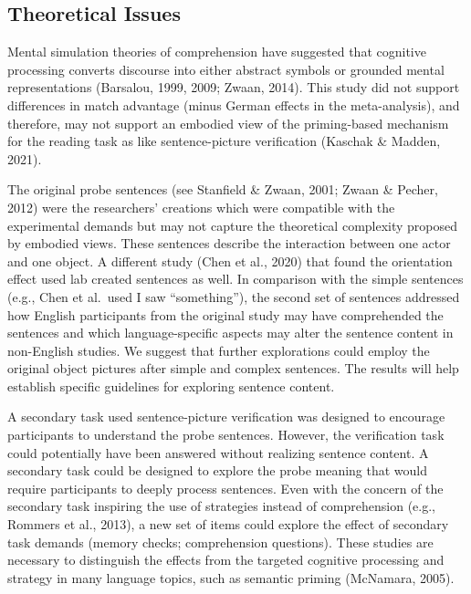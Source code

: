 \documentclass[
  man]{apa7}
\begin{document}
\hypertarget{theoretical-issues}{%
\subsection{Theoretical Issues}\label{theoretical-issues}}

Mental simulation theories of comprehension have suggested that cognitive processing converts discourse into either abstract symbols or grounded mental representations (Barsalou, 1999, 2009; Zwaan, 2014). This study did not support differences in match advantage (minus German effects in the meta-analysis), and therefore, may not support an embodied view of the priming-based mechanism for the reading task as like sentence-picture verification (Kaschak \& Madden, 2021).

The original probe sentences (see Stanfield \& Zwaan, 2001; Zwaan \& Pecher, 2012) were the researchers' creations which were compatible with the experimental demands but may not capture the theoretical complexity proposed by embodied views. These sentences describe the interaction between one actor and one object. A different study (Chen et al., 2020) that found the orientation effect used lab created sentences as well. In comparison with the simple sentences (e.g., Chen et al.~used I saw ``something''), the second set of sentences addressed how English participants from the original study may have comprehended the sentences and which language-specific aspects may alter the sentence content in non-English studies. We suggest that further explorations could employ the original object pictures after simple and complex sentences. The results will help establish specific guidelines for exploring sentence content.

A secondary task used sentence-picture verification was designed to encourage participants to understand the probe sentences. However, the verification task could potentially have been answered without realizing sentence content. A secondary task could be designed to explore the probe meaning that would require participants to deeply process sentences. Even with the concern of the secondary task inspiring the use of strategies instead of comprehension (e.g., Rommers et al., 2013), a new set of items could explore the effect of secondary task demands (memory checks; comprehension questions). These studies are necessary to distinguish the effects from the targeted cognitive processing and strategy in many language topics, such as semantic priming (McNamara, 2005).

\newpage
\end{document}
